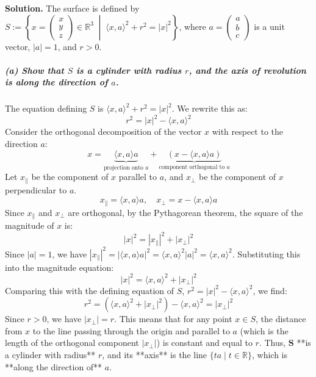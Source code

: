 \documentclass[12pt, a4paper, oneside]{article}
\newenvironment{solution}
  {\par\noindent\textbf{Solution. }\newline}
  {\par}
\begin{document}
\begin{solution}
The surface is defined by $S:=\left\{x=\begin{pmatrix} x \\ y \\ z \end{pmatrix} \in \mathbb{R}^3 \;\middle|\; \langle x,a\rangle^{2}+r^{2}=|x|^{2}\right\}$, where $a = \begin{pmatrix} a \\ b \\ c \end{pmatrix}$ is a unit vector, $|a|=1$, and $r>0$.

\subparagraph{(a) Show that $S$ is a cylinder with radius $r$, and the axis of revolution is along the direction of $a$.}
The equation defining $S$ is $\langle x,a\rangle^{2}+r^{2}=|x|^{2}$.
We rewrite this as:
$$
r^2 = |x|^2 - \langle x,a\rangle^2
$$
Consider the orthogonal decomposition of the vector $x$ with respect to the direction $a$:
$$
x = \underbrace{\langle x,a\rangle a}_{\text{projection onto } a} + \underbrace{(x - \langle x,a\rangle a)}_{\text{component orthogonal to } a}
$$
Let $x_{\|}$ be the component of $x$ parallel to $a$, and $x_{\perp}$ be the component of $x$ perpendicular to $a$.
$$
x_{\|} = \langle x,a\rangle a, \quad x_{\perp} = x - \langle x,a\rangle a
$$
Since $x_{\|}$ and $x_{\perp}$ are orthogonal, by the Pythagorean theorem, the square of the magnitude of $x$ is:
$$
|x|^2 = |x_{\|}|^2 + |x_{\perp}|^2
$$
Since $|a|=1$, we have $|x_{\|}|^2 = |\langle x,a\rangle a|^2 = \langle x,a\rangle^2 |a|^2 = \langle x,a\rangle^2$.
Substituting this into the magnitude equation:
$$
|x|^2 = \langle x,a\rangle^2 + |x_{\perp}|^2
$$
Comparing this with the defining equation of $S$, $r^2 = |x|^2 - \langle x,a\rangle^2$, we find:
$$
r^2 = (\langle x,a\rangle^2 + |x_{\perp}|^2) - \langle x,a\rangle^2 = |x_{\perp}|^2
$$
Since $r>0$, we have $|x_{\perp}| = r$.
This means that for any point $x \in S$, the distance from $x$ to the line passing through the origin and parallel to $a$ (which is the length of the orthogonal component $|x_{\perp}|$) is constant and equal to $r$.
Thus, $\mathbf{S}$ **is a cylinder with radius** $r$, and its **axis** is the line $\{ta \mid t \in \mathbb{R}\}$, which is **along the direction of** $a$.


\end{solution}
\end{document}
